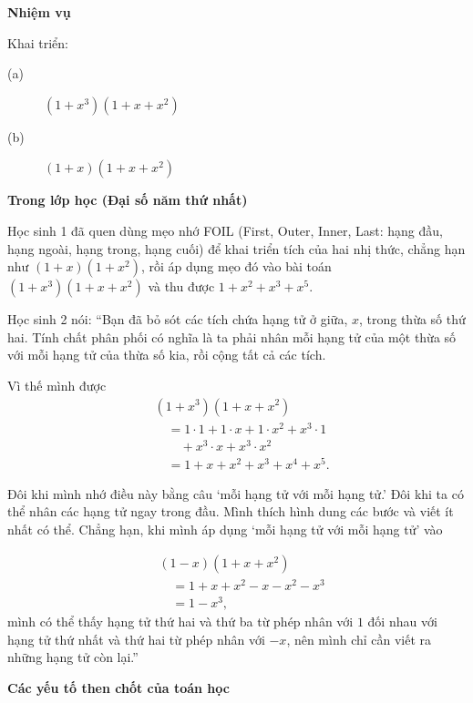   {
    \textbf{Nhiệm vụ}

    Khai triển: 

    \begin{description}
      \item [\normalfont (a)] $(1 + x^3)(1 + x + x^2)$
      \item [\normalfont (b)] $(1 + x)(1 + x + x^2)$
    \end{description}

    \textbf{Trong lớp học (Đại số năm thứ nhất)}

    Học sinh 1 đã quen dùng mẹo nhớ FOIL (First, Outer, Inner, Last: hạng đầu, hạng ngoài, hạng trong, hạng cuối) để khai triển tích của hai nhị thức, chẳng hạn như $(1 + x)(1 + x^2)$, rồi áp dụng mẹo đó vào bài toán $(1 + x^3)(1 + x + x^2)$ và thu được $1 + x^2 + x^3 + x^5$.

    Học sinh 2 nói: ``Bạn đã bỏ sót các tích chứa hạng tử ở giữa, $x$, trong thừa số thứ hai. Tính chất phân phối có nghĩa là ta phải nhân mỗi hạng tử của một thừa số với mỗi hạng tử của thừa số kia, rồi cộng tất cả các tích.

    Vì thế mình được
    $$
    \begin{aligned}
      &(1 + x^3)(1 + x + x^2) \\
        &\quad= 1 \cdot 1 + 1 \cdot x + 1 \cdot x^2 + x^3 \cdot 1 \\
        &\qquad + x^3 \cdot x + x^3 \cdot x^2 \\
        &\quad= 1 + x + x^2 + x^3 + x^4 + x^5.
    \end{aligned}
    $$

    Đôi khi mình nhớ điều này bằng câu `mỗi hạng tử với mỗi hạng tử.' Đôi khi ta có thể nhân các hạng tử ngay trong đầu. Mình thích hình dung các bước và viết ít nhất có thể. Chẳng hạn, khi mình áp dụng `mỗi hạng tử với mỗi hạng tử' vào

    $$
    \begin{aligned}
      &(1 - x)(1 + x + x^2) \\
      &\quad = 1 + x + x^2 - x - x^2 - x^3 \\
      &\quad = 1 - x^3,
    \end{aligned}
    $$
    mình có thể thấy hạng tử thứ hai và thứ ba từ phép nhân với $1$ đối nhau với hạng tử thứ nhất và thứ hai từ phép nhân với $-x$, nên mình chỉ cần viết ra những hạng tử còn lại.''\vspace{\baselineskip}

    \textbf{Các yếu tố then chốt của toán học}

}
